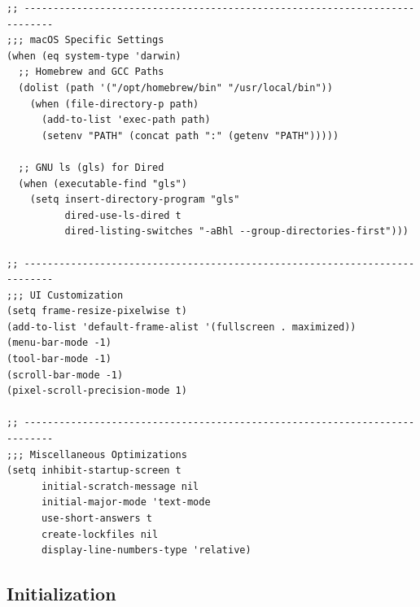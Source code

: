 \documentclass[11pt]{article}
\begin{document}
\begin{verbatim}
;; ---------------------------------------------------------------------------
;;; macOS Specific Settings
(when (eq system-type 'darwin)
  ;; Homebrew and GCC Paths
  (dolist (path '("/opt/homebrew/bin" "/usr/local/bin"))
    (when (file-directory-p path)
      (add-to-list 'exec-path path)
      (setenv "PATH" (concat path ":" (getenv "PATH")))))

  ;; GNU ls (gls) for Dired
  (when (executable-find "gls")
    (setq insert-directory-program "gls"
          dired-use-ls-dired t
          dired-listing-switches "-aBhl --group-directories-first")))

;; ---------------------------------------------------------------------------
;;; UI Customization
(setq frame-resize-pixelwise t)
(add-to-list 'default-frame-alist '(fullscreen . maximized))
(menu-bar-mode -1)
(tool-bar-mode -1)
(scroll-bar-mode -1)
(pixel-scroll-precision-mode 1)

;; ---------------------------------------------------------------------------
;;; Miscellaneous Optimizations
(setq inhibit-startup-screen t
      initial-scratch-message nil
      initial-major-mode 'text-mode
      use-short-answers t
      create-lockfiles nil
      display-line-numbers-type 'relative)

\end{verbatim}
\subsection{Initialization}
\label{sec:org21b7437}
\end{document}
